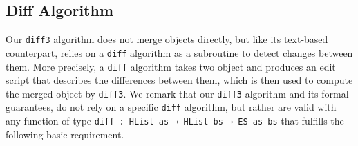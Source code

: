 \documentclass{sigplanconf}
\theoremstyle{plain}
\begin{document}
\subsection{Diff Algorithm}
\label{subsec:diff-algo}
Our \texttt{diff3} algorithm does not merge objects directly, but like
its text-based counterpart, relies on a \texttt{diff} algorithm
as a subroutine to detect changes between them.
%
More precisely, a \texttt{diff} algorithm takes two object and produces
an edit script that describes the differences between them, which is
then used to compute the merged object by \texttt{diff3}.
%
We remark that our \texttt{diff3} algorithm and its formal guarantees,
do not rely on a specific \texttt{diff} algorithm, but rather are
valid with any function of type \texttt{diff : HList as → HList bs →
  ES as bs} that fulfills the following basic requirement.
\end{document}
